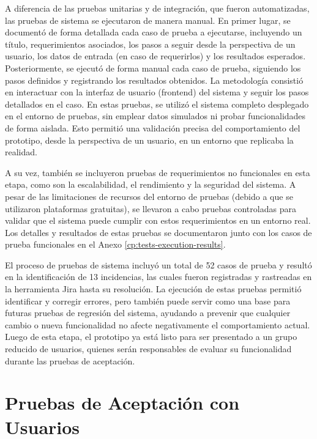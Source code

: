 A diferencia de las pruebas unitarias y de integración, que fueron automatizadas, las pruebas de sistema se ejecutaron de manera manual. En primer lugar, se documentó de forma detallada cada caso de prueba a ejecutarse, incluyendo un título, requerimientos asociados, los pasos a seguir desde la perspectiva de un usuario, los datos de entrada (en caso de requerirlos) y los resultados esperados. Posteriormente, se ejecutó de forma manual cada caso de prueba, siguiendo los pasos definidos y registrando los resultados obtenidos. La metodología consistió en interactuar con la interfaz de usuario (frontend) del sistema y seguir los pasos detallados en el caso. En estas pruebas, se utilizó el sistema completo desplegado en el entorno de pruebas, sin emplear datos simulados ni probar funcionalidades de forma aislada. Esto permitió una validación precisa del comportamiento del prototipo, desde la perspectiva de un usuario, en un entorno que replicaba la realidad.

A su vez, también se incluyeron pruebas de requerimientos no funcionales en esta etapa, como son la escalabilidad, el rendimiento y la seguridad del sistema. A pesar de las limitaciones de recursos del entorno de pruebas (debido a que se utilizaron plataformas gratuitas), se llevaron a cabo pruebas controladas para validar que el sistema puede cumplir con estos requerimientos en un entorno real. Los detalles y resultados de estas pruebas se documentaron junto con los casos de prueba funcionales en el Anexo \ref{cp:tests-execution-results}.

El proceso de pruebas de sistema incluyó un total de 52 casos de prueba y resultó en la identificación de 13 incidencias, las cuales fueron registradas y rastreadas en la herramienta Jira hasta su resolución. La ejecución de estas pruebas permitió identificar y corregir errores, pero también puede servir como una base para futuras pruebas de regresión del sistema, ayudando a prevenir que cualquier cambio o nueva funcionalidad no afecte negativamente el comportamiento actual. Luego de esta etapa, el prototipo ya está listo para ser presentado a un grupo reducido de usuarios, quienes serán responsables de evaluar su funcionalidad durante las pruebas de aceptación.


\section{Pruebas de Aceptación con Usuarios}
\label{sec:user-acceptance-testing}

